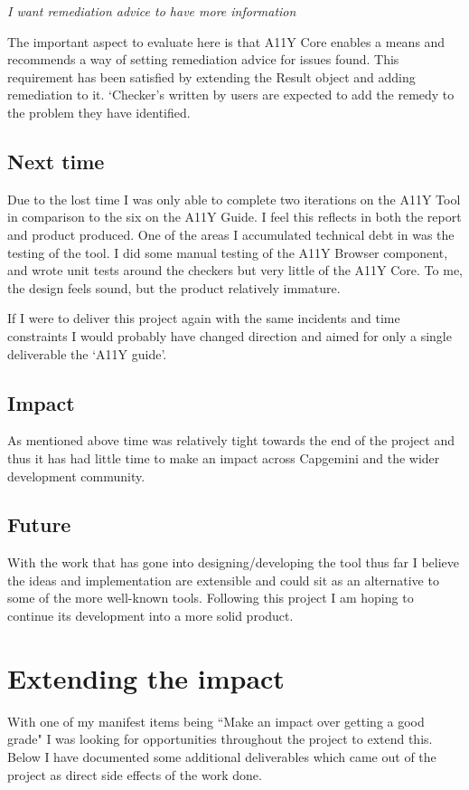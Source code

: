 \begin{center}
\textit{I want remediation advice to have more information}
\end{center}
The important aspect to evaluate here is that A11Y Core enables a means and
recommends a way of setting remediation advice for issues found. This
requirement has been satisfied by extending the Result object and adding
remediation to it. `Checker's written by users are expected to add the remedy
to the problem they have identified.

\subsection{Next time}
Due to the lost time I was only able to complete two iterations on the A11Y
Tool in comparison to the six on the A11Y Guide. I feel this reflects in both
the report and product produced. One of the areas I accumulated technical
debt in was the testing of the tool. I did some manual testing of the A11Y
Browser component, and wrote unit tests around the checkers but very
little of the A11Y Core. To me, the design feels sound, but the product
relatively immature.

If I were to deliver this project again with the same incidents and time
constraints I would probably have changed direction and aimed for only a
single deliverable the `A11Y guide'.

\subsection{Impact}
As mentioned above time was relatively tight towards the end of the project
and thus it has had little time to make an impact across Capgemini and the
wider development community.

\subsection{Future}
With the work that has gone into designing/developing the tool thus far I
believe the ideas and implementation are extensible and could sit as an
alternative to some of the more well-known tools. Following this project I am
hoping to continue its development into a more solid product.


\section{Extending the impact}
With one of my manifest items being ``Make an impact over getting a good
grade" I was looking for opportunities throughout the project to extend this.
Below I have documented some additional deliverables which came out of the
project as direct side effects of the work done.

